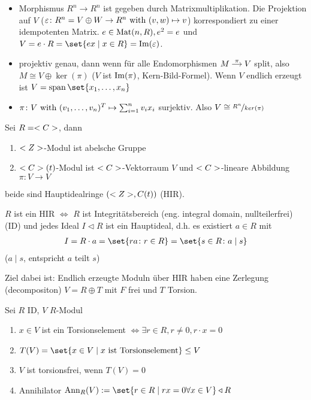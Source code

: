 \begin{erinnerung}
	\begin{itemize}
		\item Morphismus $R^n \to R^n$ ist gegeben durch Matrixmultiplikation. Die Projektion auf $V$ ($\varepsilon \colon R^n = V \oplus W \to R^n \text{ with } (v,w) \mapsto v$) korrespondiert zu einer idempotenten Matrix. $e \in \operatorname{Mat}(n,R), e^2 = e$ und $V = e\cdot R = \set{e x \mid x \in R} = \Image(\epsilon)$. 
		\item projektiv genau, dann wenn für alle Endomorphismen $\begin{tikzcd}[cramped, sep=small]
		M \arrow[r, "\pi"] & V
		\end{tikzcd}$ split, also $M \cong V \oplus \ker(\pi)$ ($V$ ist $\operatorname{Im}(\pi)$, Kern-Bild-Formel). Wenn $V$ endlich erzeugt ist $V = \Span\set{x_1, \dots, x_n}$
		\item $\pi \colon V \text{ with } (v_1, \dots, v_n)^T \mapsto \sum_{i=1}^n v_i x_i$ surjektiv. Also $V \cong \lnkset{R^n}{ker(\pi)}$
	\end{itemize}
\end{erinnerung}
\begin{example}
	Sei $R = <C>$, dann
	\begin{enumerate}
		\item $<Z>$-Modul ist abelsche Gruppe
		\item $<C>(t)$-Modul ist $<C>$-Vektorraum $V$ und $<C>$-lineare Abbildung $\pi\colon V \to V$
	\end{enumerate}
	beide sind Hauptidealringe $(<Z>, C(t))$ (HIR).
\end{example}
\begin{definition}
	$R$ ist ein HIR $\Leftrightarrow$ $R$ ist Integritätsbereich (eng. integral domain, nullteilerfrei) (ID) und jedes Ideal $I \lhd R$ ist ein Hauptideal, d.h. es existiert $a \in R$ mit
	\begin{align*}
		I = R \cdot a = \set{ra \colon r \in R} = \set{s \in R \colon a \mid s}
	\end{align*}
	($a \mid s$, entspricht $a$ teilt $s$)
\end{definition}
Ziel dabei ist: Endlich erzeugte Moduln über HIR haben eine Zerlegung (decompositon) $V = R \oplus T$ mit $F$ frei und $T$ Torsion.
\begin{definition}
	Sei $R$ ID, $V$ $R$-Modul
	\begin{enumerate}
		\item $x \in V$ ist ein Torsionselement $\Leftrightarrow \exists r \in R, r \neq 0, r\cdot x = 0$
		\item $T(V) = \set{x \in V \mid x \text{ ist Torsionselement}} \le V$
		\item $V$ ist torsionsfrei, wenn $T(V) = 0$
		\item Annihilator $\Ann_R (V) := \set{r \in R \mid rx = 0 \forall x \in V} \lhd R$
	\end{enumerate}
\end{definition}
